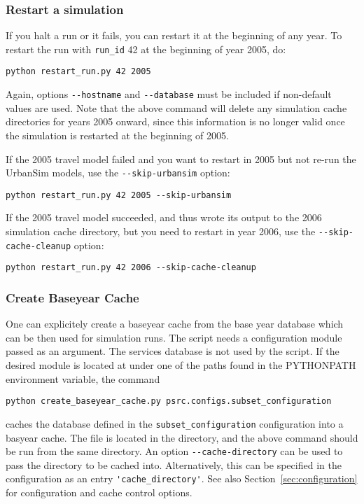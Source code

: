 \subsubsection{Restart a simulation}
If you halt a run or it fails, you can restart it at the beginning of any year.
To restart the run with \verb|run_id| 42 at the beginning of year 2005, do:
\pythonindex
\begin{verbatim}
python restart_run.py 42 2005
\end{verbatim}
Again, options \verb|--hostname| and \verb|--database| must be included
if non-default values are used.  Note that the above command will delete any
simulation cache \simulationcacheindex directories for years 2005 onward, since
this information is no longer valid once the simulation is restarted at the
beginning of 2005.

If the 2005 travel model failed and you want to restart in 2005 but not re-run
the UrbanSim models, \modelsindex use the \verb|--skip-urbansim| option:
\pythonindex
\begin{verbatim}
python restart_run.py 42 2005 --skip-urbansim
\end{verbatim}

If the 2005 travel model succeeded, and thus wrote its output to the 2006
simulation cache \simulationcacheindex directory, but you need to restart in year 2006, use the
\verb|--skip-cache-cleanup| option:
\pythonindex
\begin{verbatim}
python restart_run.py 42 2006 --skip-cache-cleanup
\end{verbatim}

\subsubsection{Create Baseyear Cache}
\label{sec:run-manager-baseyearcache}
%
One can explicitely create a baseyear
cache \baseyearcacheindex{} from
the base year database which can be then used for simulation runs. The script
needs a configuration module passed as an argument. The services database is
not used by the script. If the desired module is located at
 under one of the paths found in the
PYTHONPATH \pythonpathindex environment variable, \environmentvariablesindex the command
\pythonindex
\begin{verbatim}
python create_baseyear_cache.py psrc.configs.subset_configuration
\end{verbatim}
caches the database defined in the \verb|subset_configuration| configuration into a basyear
cache. \baseyearcacheindex The  file is located in
the  directory, and the above command should be
run from the same directory. An option \verb|--cache-directory|
can be used to pass the directory to be cached into. Alternatively, this can be
specified in the configuration as an entry \verb|'cache_directory'|. See also
Section~\ref{sec:configuration} for configuration and cache control options.

